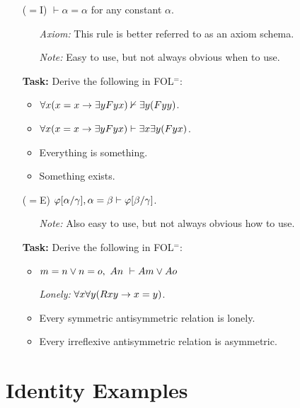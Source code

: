\documentclass[a4paper, 11pt]{article} %
\begin{document}
\begin{enumerate}
  \item[($=$I)] $\vdash \alpha = \alpha$ for any constant $\alpha$. 
    \begin{itemize}
      \item[\it Axiom:] This rule is better referred to as an axiom schema.
      \item[\it Note:] Easy to use, but not always obvious when to use.
    \end{itemize}
  \item[\bf Task:] Derive the following in FOL$^=$:
    \begin{itemize}
      \item $\forall x(x=x \rightarrow \exists yFyx) \nvdash \exists y(Fyy)$.
      \item $\forall x(x=x \rightarrow \exists yFyx) \vdash \exists x \exists y(Fyx)$.
      \item Everything is something.
      \item Something exists.
    \end{itemize}
  \item[($=$E)] $\varphi[\alpha/\gamma],\alpha=\beta\vdash\varphi[\beta/\gamma]$.
    \begin{itemize}
      \item[\it Note:] Also easy to use, but not always obvious how to use.
    \end{itemize}
  \item[\bf Task:] Derive the following in FOL$^=$:
    \begin{itemize}
      \item $m = n \vee n = o,\ An\ \vdash Am \vee Ao$
      \item[\it Lonely:] $\forall x\forall y(Rxy \rightarrow x = y)$. 
      \item Every symmetric antisymmetric relation is lonely.
      \item Every irreflexive antisymmetric relation is asymmetric.
    \end{itemize}
\end{enumerate}




\section*{Identity Examples}
\end{document}
